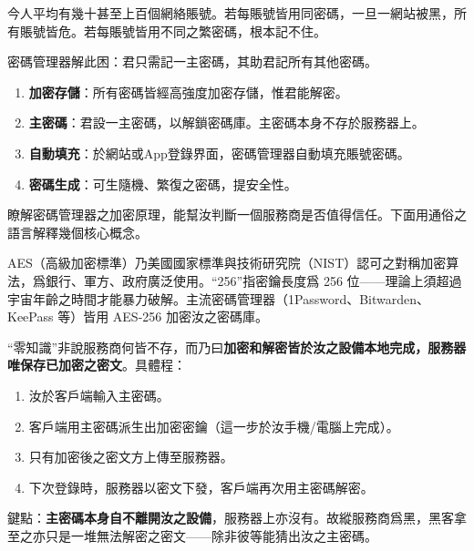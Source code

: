 


今人平均有幾十甚至上百個網絡賬號。若每賬號皆用同密碼，一旦一網站被黑，所有賬號皆危。若每賬號皆用不同之繁密碼，根本記不住。

密碼管理器解此困：君只需記一主密碼，其助君記所有其他密碼。


\begin{enumerate}
  \item \textbf{加密存儲}：所有密碼皆經高強度加密存儲，惟君能解密。
  \item \textbf{主密碼}：君設一主密碼，以解鎖密碼庫。主密碼本身不存於服務器上。
  \item \textbf{自動填充}：於網站或App登錄界面，密碼管理器自動填充賬號密碼。
  \item \textbf{密碼生成}：可生隨機、繁復之密碼，提安全性。
\end{enumerate}


瞭解密碼管理器之加密原理，能幫汝判斷一個服務商是否值得信任。下面用通俗之語言解釋幾個核心概念。


AES（高級加密標準）乃美國國家標準與技術研究院（NIST）認可之對稱加密算法，爲銀行、軍方、政府廣泛使用。“256”指密鑰長度爲 256 位——理論上須超過宇宙年齡之時間才能暴力破解。主流密碼管理器（1Password、Bitwarden、KeePass 等）皆用 AES-256 加密汝之密碼庫。


“零知識”非說服務商何皆不存，而乃曰\textbf{加密和解密皆於汝之設備本地完成，服務器唯保存已加密之密文}。具體程：

\begin{enumerate}
  \item 汝於客戶端輸入主密碼。
  \item 客戶端用主密碼派生出加密密鑰（這一步於汝手機/電腦上完成）。
  \item 只有加密後之密文方上傳至服務器。
  \item 下次登錄時，服務器以密文下發，客戶端再次用主密碼解密。
\end{enumerate}

鍵點：\textbf{主密碼本身自不離開汝之設備}，服務器上亦沒有。故縱服務商爲黑，黑客拿至之亦只是一堆無法解密之密文——除非彼等能猜出汝之主密碼。

